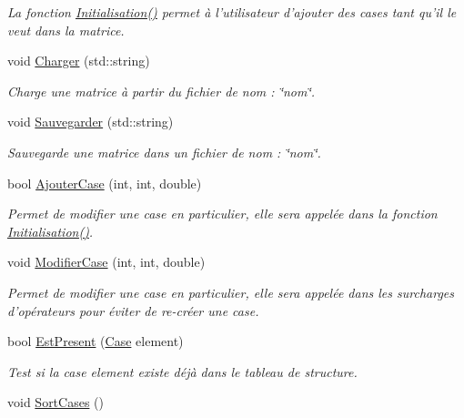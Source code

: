 \begin{DoxyCompactItemize}
\begin{DoxyCompactList}\small\item\em La fonction \hyperlink{classMatrice_af2e5ed60f4d4ccbbc16140fa4e4d0ef0}{Initialisation()} permet à l'utilisateur d'ajouter des cases tant qu'il le veut dans la matrice. \end{DoxyCompactList}\item 
void \hyperlink{classMatrice_ab1cf951124693247bc59fcf7a5649b3c}{Charger} (std\-::string)
\begin{DoxyCompactList}\small\item\em Charge une matrice à partir du fichier de nom \-: \char`\"{}nom\char`\"{}. \end{DoxyCompactList}\item 
void \hyperlink{classMatrice_ada819efc5f484ea7f41bfe9f79c77694}{Sauvegarder} (std\-::string)
\begin{DoxyCompactList}\small\item\em Sauvegarde une matrice dans un fichier de nom \-: \char`\"{}nom\char`\"{}. \end{DoxyCompactList}\item 
bool \hyperlink{classMatrice_a8af31f6f88fa6fb2be45687b221286d1}{Ajouter\-Case} (int, int, double)
\begin{DoxyCompactList}\small\item\em Permet de modifier une case en particulier, elle sera appelée dans la fonction \hyperlink{classMatrice_af2e5ed60f4d4ccbbc16140fa4e4d0ef0}{Initialisation()}. \end{DoxyCompactList}\item 
void \hyperlink{classMatrice_ad43a0aff1d4a0867c5a7a41578379429}{Modifier\-Case} (int, int, double)
\begin{DoxyCompactList}\small\item\em Permet de modifier une case en particulier, elle sera appelée dans les surcharges d'opérateurs pour éviter de re-\/créer une case. \end{DoxyCompactList}\item 
bool \hyperlink{classMatrice_a57bd41fe4dc7b130c7c808d35f2c11f1}{Est\-Present} (\hyperlink{structCase}{Case} element)
\begin{DoxyCompactList}\small\item\em Test si la case element existe déjà dans le tableau de structure. \end{DoxyCompactList}\item 
\hypertarget{classMatrice_a8134f1da15692ce66fd026b9333eb1e0}{void \hyperlink{classMatrice_a8134f1da15692ce66fd026b9333eb1e0}{Sort\-Cases} ()}\label{classMatrice_a8134f1da15692ce66fd026b9333eb1e0}


\end{DoxyCompactItemize}
